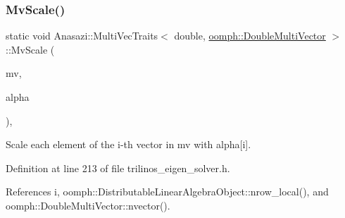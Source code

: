 \subsubsection{\texorpdfstring{Mv\+Scale()}{MvScale()}\hspace{0.1cm}{\footnotesize\ttfamily [2/2]}}
{\footnotesize\ttfamily static void Anasazi\+::\+Multi\+Vec\+Traits$<$ double, \hyperlink{classoomph_1_1DoubleMultiVector}{oomph\+::\+Double\+Multi\+Vector} $>$\+::Mv\+Scale (\begin{DoxyParamCaption}\item[{\hyperlink{classoomph_1_1DoubleMultiVector}{oomph\+::\+Double\+Multi\+Vector} \&}]{mv,  }\item[{const std\+::vector$<$ double $>$ \&}]{alpha }\end{DoxyParamCaption})\hspace{0.3cm}{\ttfamily [inline]}, {\ttfamily [static]}}



Scale each element of the {\ttfamily i-\/th} vector in {\ttfamily mv} with {\ttfamily alpha}\mbox{[}i\mbox{]}. 



Definition at line 213 of file trilinos\+\_\+eigen\+\_\+solver.\+h.



References i, oomph\+::\+Distributable\+Linear\+Algebra\+Object\+::nrow\+\_\+local(), and oomph\+::\+Double\+Multi\+Vector\+::nvector().

\mbox{\label{classAnasazi_1_1MultiVecTraits_3_01double_00_01oomph_1_1DoubleMultiVector_01_4_a41445251a1d0c052e1b24f4b75abbe41}} 
